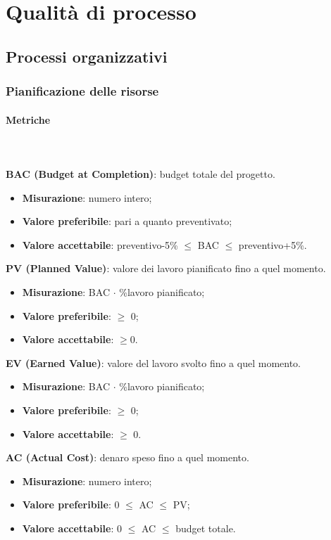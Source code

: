 \section{Qualità di processo}
	\subsection{Processi organizzativi}
		\subsubsection{Pianificazione delle risorse}
			\paragraph{Metriche} \mbox{} \\ \\
				\textbf{BAC (Budget at Completion)}: budget totale del progetto\glo.
				\begin{itemize}
					\item \textbf{Misurazione}: numero intero;
					\item \textbf{Valore preferibile}: pari a quanto preventivato;
					\item \textbf{Valore accettabile}: preventivo-5\% $\le$ BAC $\le$ preventivo+5\%.
				\end{itemize}
				\textbf{PV (Planned Value)}: valore dei lavoro pianificato fino a quel momento.
				\begin{itemize}
					\item \textbf{Misurazione}: BAC $\cdot$ \%lavoro pianificato;
					\item \textbf{Valore preferibile}: $\ge$ 0;
					\item \textbf{Valore accettabile}: $\ge$0.
				\end{itemize}
				\textbf{EV (Earned Value)}: valore del lavoro svolto fino a quel momento.
				\begin{itemize}
					\item \textbf{Misurazione}: BAC $\cdot$ \%lavoro pianificato;
					\item \textbf{Valore preferibile}: $\ge$ 0;
					\item \textbf{Valore accettabile}: $\ge$ 0.
				\end{itemize}
				\textbf{AC (Actual Cost)}: denaro speso fino a quel momento.
				\begin{itemize}
					\item \textbf{Misurazione}: numero intero;
					\item \textbf{Valore preferibile}: 0 $\le$ AC $\le$ PV;
					\item \textbf{Valore accettabile}: 0 $\le$ AC $\le$ budget totale.
				\end{itemize}
